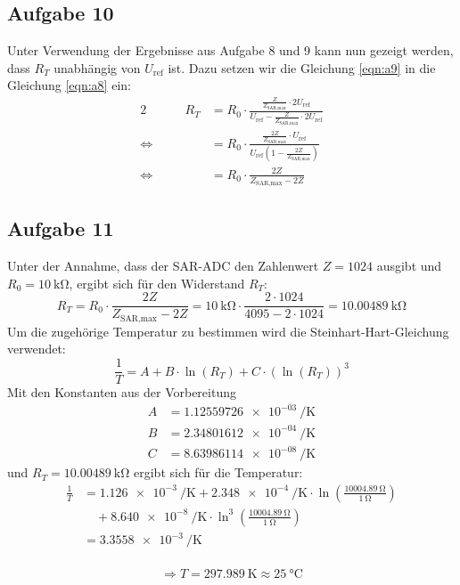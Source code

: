 \subsection{Aufgabe 10}
Unter Verwendung der Ergebnisse aus Aufgabe 8 und 9 kann nun gezeigt werden, dass
$R_T$ unabhängig von $U_{\text{ref}}$ ist.
Dazu setzen wir die Gleichung \ref{eqn:a9} in die Gleichung \ref{eqn:a8} ein:
\begin{alignat}{2}
    \label{eqn:a10}
                    & \quad & R_T & = R_0 \cdot \frac{\frac{Z}{Z_{\text{SAR,max}}} \cdot 2U_{\text{ref}}}{U_{\text{ref}} - \frac{Z}{Z_{\text{SAR,max}}} \cdot 2U_{\text{ref}}} \nonumber \\
    \Leftrightarrow &       &     & = R_0 \cdot \frac{\frac{2Z}{Z_{\text{SAR,max}}} \cdot U_{\text{ref}}}{U_{\text{ref}} \left( 1 - \frac{2Z}{Z_{\text{SAR,max}}} \right)}               \\
    \Leftrightarrow &       &     & = R_0 \cdot \frac{2Z}{Z_{\text{SAR,max}} - 2Z} \nonumber
\end{alignat}

\subsection{Aufgabe 11}
Unter der Annahme, dass der SAR-ADC den Zahlenwert $Z = 1024$ ausgibt und $R_0 = \SI{10}{\kilo\ohm}$, ergibt sich für den Widerstand $R_T$:
\begin{equation}
    R_T = R_0 \cdot \frac{2Z}{Z_{\text{SAR,max}} - 2Z} = \SI{10}{\kilo\ohm} \cdot \frac{2 \cdot 1024}{4095 - 2 \cdot 1024} = \SI{10.00489}{\kilo\ohm}
\end{equation}
Um die zugehörige Temperatur zu bestimmen wird die Steinhart-Hart-Gleichung verwendet:
\begin{equation}
    \frac{1}{T} = A + B \cdot \ln(R_T) + C \cdot (\ln(R_T))^3
\end{equation}
Mit den Konstanten aus der Vorbereitung
\begin{align*}
    A & = \SI{1.12559726e-03}{\per\kelvin} \\
    B & = \SI{2.34801612e-04}{\per\kelvin} \\
    C & = \SI{8.63986114e-08}{\per\kelvin}
\end{align*}
und $R_T = \SI{10.00489}{\kilo\ohm}$ ergibt sich für die Temperatur:
\begin{align*}
    \frac{1}{T} & = \SI{1.126e-3}{\per\kelvin} + \SI{2.348e-4}{\per\kelvin} \cdot \ln\left(\frac{\SI{10004.89}{\ohm}}{\SI{1}{\ohm}}\right) \\
                & \quad + \SI{8.640e-8}{\per\kelvin} \cdot \ln^3\left(\frac{\SI{10004.89}{\ohm}}{\SI{1}{\ohm}}\right)                      \\
                & = \SI{3.3558e-3}{\per\kelvin}                                                                                            \\
\end{align*}

\begin{equation}
    \Rightarrow \boxed{T = \SI{297.989}{\kelvin} \approx \SI{25}{\degreeCelsius}}
\end{equation}


